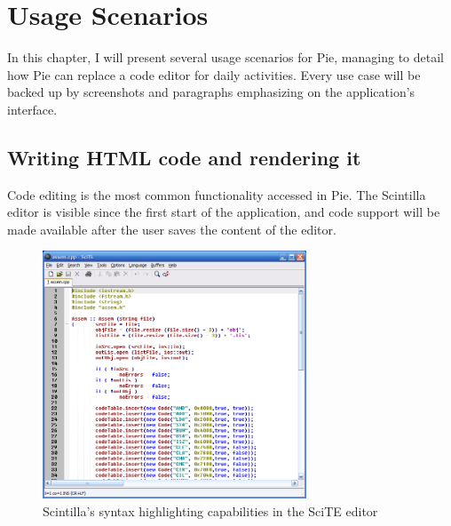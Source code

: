 \chapter{Usage Scenarios}
\thispagestyle{pagestyle}

In this chapter, I will present several usage scenarios for Pie, managing to detail how Pie can replace a code editor for daily activities. Every use case will be backed up by screenshots and paragraphs emphasizing on the application's interface.

\section{Writing HTML code and rendering it}

Code editing is the most common functionality accessed in Pie. The Scintilla editor is visible since the first start of the application, and code support will be made available after the user saves the content of the editor.

\begin{figure}[H]
\centering
\includegraphics[width=0.7\textwidth]{images/scite.png}
\caption{Scintilla's syntax highlighting capabilities in the SciTE editor}
\label{fig:fig2,1.}
\end{figure}